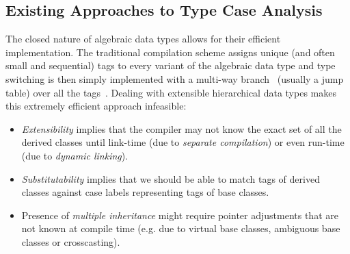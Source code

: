
\subsection{Existing Approaches to Type Case Analysis}
\label{sec:prev}

The closed nature of algebraic data types allows for their efficient 
implementation. The traditional compilation scheme assigns unique (and often 
small and sequential) tags to every variant of the algebraic data type and type 
switching is then simply implemented with a multi-way branch~\cite{Spuler94} 
(usually a jump table) over all the tags~\cite{Augustsson85}. Dealing with 
extensible hierarchical data types makes this extremely efficient approach 
infeasible:

\begin{itemize}
\setlength{\itemsep}{0pt}
\setlength{\parskip}{0pt}
\item \emph{Extensibility} implies that the compiler may not know the exact set 
      of all the derived classes until link-time (due to \emph{separate compilation}) 
      or even run-time (due to \emph{dynamic linking}).
\item \emph{Substitutability} implies that we should be able to 
      match tags of derived classes against case labels representing tags of 
      base classes.
\item Presence of \emph{multiple inheritance} might require pointer adjustments 
      that are not known at compile time (e.g. due to virtual base classes, 
      ambiguous base classes or crosscasting).
\end{itemize}

%

